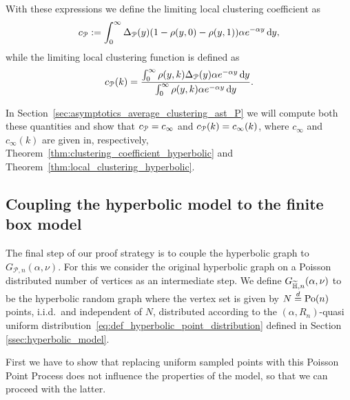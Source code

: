 With these expressions we define the limiting local clustering coefficient as
\begin{equation}\label{eq:def_average_clustering_infinite_model}
	c_{{\mathcal P}} := \int_0^\infty \Delta_{{\mathcal P}}(y) (1 - \rho(y,0) - \rho(y,1)) \alpha e^{-\alpha y} \operatorname{\mathrm{d}\hspace{-2pt}} y,
\end{equation}
while the limiting local clustering function is defined as
\begin{equation}\label{eq:def_c_infty_k}
	c_{{\mathcal P}}(k) = \frac{\int_0^\infty \rho(y,k) \Delta_{{\mathcal P}}(y) \alpha e^{-\alpha y} \operatorname{\mathrm{d}\hspace{-2pt}} y}{\int_0^\infty \rho(y,k) \alpha e^{-\alpha y} \operatorname{\mathrm{d}\hspace{-2pt}} y}.
\end{equation}

In Section~\ref{sec:asymptotics_average_clustering_ast_P} we will compute both these quantities and show that $c_{{\mathcal P}} = c_\infty$ and $c_{{\mathcal P}}(k) = c_\infty(k)$, where $c_\infty$ and $c_\infty(k)$ are given in, respectively, Theorem~\ref{thm:clustering_coefficient_hyperbolic} and Theorem~\ref{thm:local_clustering_hyperbolic}.










\subsection{Coupling the hyperbolic model to the finite box model}\label{ssec:coupling_H_P}

The final step of our proof strategy is to couple the hyperbolic graph to $G_{\mathcal{P},n}(\alpha, \nu)$. For this we consider the original hyperbolic graph on a Poisson distributed number of vertices as an intermediate step. We define $G_{\widetilde{\mathbb{H}},n}(\alpha, \nu)$ to be the hyperbolic random graph where the vertex set is given by $N \stackrel{d}{=} {\mathrm{Po}}(n)$ points, i.i.d.~and independent of $N$, distributed according to the $(\alpha, R_n)$-quasi uniform distribution~\eqref{eq:def_hyperbolic_point_distribution} defined in Section \ref{ssec:hyperbolic_model}. 


First we have to show that replacing uniform sampled points with this Poisson Point Process does not influence the properties of the model, so that we can proceed with the latter.


